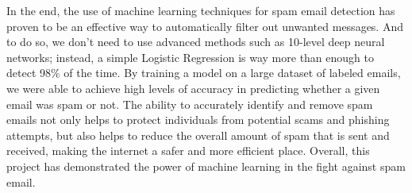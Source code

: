 
In the end, the use of machine learning techniques for spam email detection has proven to be an effective way to automatically filter out unwanted messages.
And to do so, we don't need to use advanced methods such as 10-level deep neural networks;
 instead, a simple Logistic Regression is way more than enough to detect 98\% of the time.
By training a model on a large dataset of labeled emails, we were able to achieve high levels of accuracy in predicting whether a given email was spam or not.
The ability to accurately identify and remove spam emails not only helps to protect individuals from potential scams and phishing attempts,
but also helps to reduce the overall amount of spam that is sent and received, making the internet a safer and more efficient place.
Overall, this project has demonstrated the power of machine learning in the fight against spam email.
\newpage
\singlespacing




